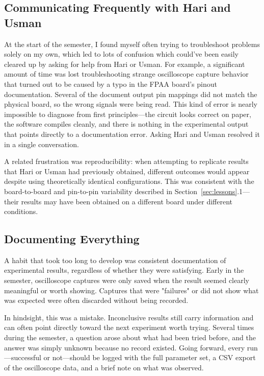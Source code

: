 \documentclass[12pt, letterpaper]{article}
\begin{document}
\subsection{Communicating Frequently with Hari and Usman}

At the start of the semester, I found myself often trying to troubleshoot problems solely on my own, which led to lots of confusion which could've been easily cleared up by asking for help from Hari or Usman. For example, a significant amount of time was lost troubleshooting strange oscilloscope capture behavior that turned out to be caused by a typo in the FPAA board's
pinout documentation. Several of the document output pin mappings did not match the physical board, so the 
wrong signals were being read. This kind of error is nearly
impossible to diagnose from first principles---the circuit looks correct on paper, the
software compiles cleanly, and there is nothing in the experimental output that points
directly to a documentation error. Asking Hari and Usman resolved it in a single
conversation.

A related frustration was reproducibility: when attempting to replicate results that
Hari or Usman had previously obtained, different outcomes would appear despite using
theoretically identical configurations. This was consistent with the board-to-board and pin-to-pin variability described in
Section~\ref{sec:lessons}.1---their results may have been obtained on a different board under different conditions.  

\subsection{Documenting Everything}

A habit that took too long to develop was consistent documentation of experimental
results, regardless of whether they were satisfying. Early in the semester, oscilloscope
captures were only saved when the result seemed clearly meaningful or worth showing. Captures that were "failures" or did not show what was expected were often discarded without being recorded.

In hindsight, this was a mistake. Inconclusive results still carry information and can often point directly toward the next experiment worth trying. Several times during
the semester, a question arose about what had been tried before, and the answer was simply
unknown because no record existed. Going forward, every run---successful or not---should
be logged with the full parameter set, a CSV export of the oscilloscope data, and a brief
note on what was observed.
\end{document}
